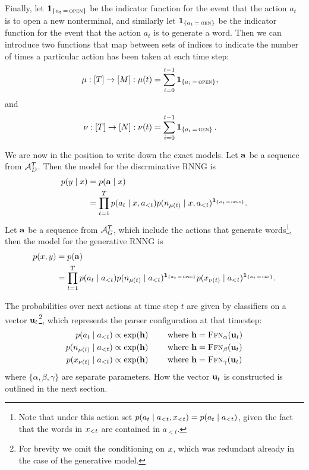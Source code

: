 Finally, let $\operatorname{\mathbf{1}}_{ \{ a_t \, = \, \textsc{open} \} }$ be the indicator function for the event that the action $a_t$ is to open a new nonterminal, and similarly let $\operatorname{\mathbf{1}}_{ \{ a_t \, = \, \textsc{gen} \} }$ be the indicator function for the event that the action $a_t$ is to generate a word. Then we can introduce two functions that map between sets of indices to indicate the number of times a particular action has been taken at each time step:
\begin{align*}
  \mu &: [ T ] \to [ M ]: \mu(t) = \sum_{i=0}^{t-1} \operatorname{\mathbf{1}}_{ \{ a_i \, = \, \textsc{open} \} },
\end{align*}
and
\begin{align*}
  \nu &: [ T ] \to [ N ]: \nu(t) = \sum_{i=0}^{t-1} \operatorname{\mathbf{1}}_{ \{ a_i \, = \, \textsc{gen} \} }.
\end{align*}

We are now in the position to write down the exact models. Let $\mathbf{a}$ be a sequence from $\mathcal{A}_D^T$. Then the model for the discrminative RNNG is
\begin{align}
  \label{eq:disc-model}
  p(y \mid x)
    &= p(\mathbf{a} \mid x)  \\
    &= \prod_{t=1}^T p(a_t \mid x, a_{<t}) p(n_{\mu(t)} \mid x, a_{<t} )^{ \operatorname{\mathbf{1}}_{ \{ a_t \, = \, \textsc{open} \} } }.
\end{align}
Let $\mathbf{a}$ be a sequence from $\mathcal{A}_G^T$, which include the actions that generate words\footnote{Note that under this action set $p(a_t \mid a_{<t}, x_{<t}) = p(a_t \mid a_{<t})$, given the fact that the words in $x_{<t}$ are contained in $a_{<t}$.}, then the model for the generative RNNG is
\begin{align}
  \label{eq:gen-model}
  p(x, y)
    &= p(\mathbf{a})  \\
    &= \prod_{t=1}^T p(a_t \mid a_{<t}) p(n_{\mu(t)} \mid   a_{<t})^{ \operatorname{\mathbf{1}}_{ \{ a_t \, = \, \textsc{open} \} } } p(x_{\nu(t)} \mid a_{<t})^{ \operatorname{\mathbf{1}}_{ \{ a_t \, = \, \textsc{gen} \} } }.
\end{align}

The probabilities over next actions at time step $t$ are given by classifiers on a vector $\mathbf{u}_t$\footnote{For brevity we omit the conditioning on $x$, which was redundant already in the case of the generative model.}, which represents the parser configuration at that timestep:
\begin{align}
  \label{eq:action-regression}
  p(a_t \mid a_{<t})
    &\propto \exp( \mathbf{h} ) \qquad \text{ where } \mathbf{h} = \textsc{Ffn}_{\alpha}( \mathbf{u}_t )  \\
  p(n_{\mu(t)} \mid a_{<t})
    &\propto \exp( \mathbf{h} ) \qquad \text{ where } \mathbf{h} = \textsc{Ffn}_{\beta}( \mathbf{u}_t )  \\
  p(x_{\nu(t)} \mid a_{<t})
    &\propto \exp( \mathbf{h} ) \qquad \text{ where } \mathbf{h} = \textsc{Ffn}_{\gamma}( \mathbf{u}_t )
\end{align}
where $\{\alpha, \beta, \gamma\}$ are separate parameters. How the vector $\mathbf{u}_t$ is constructed is outlined in the next section.

